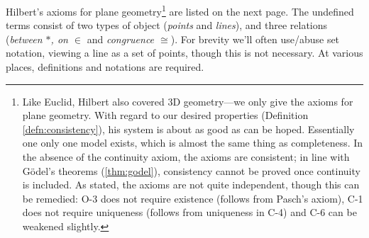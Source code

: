 Hilbert's axioms for plane geometry\footnote{Like Euclid, Hilbert also covered 3D geometry---we only give the axioms for plane geometry. With regard to our desired properties (Definition \ref{defn:consistency}), his system is about as good as can be hoped. Essentially one only one model exists, which is almost the same thing as completeness. In the absence of the continuity axiom, the axioms are consistent; in line with Gödel's theorems (\ref{thm:godel}), consistency cannot be proved once continuity is included. As stated, the axioms are not quite independent, though this can be remedied: O-3 does not require existence (follows from Pasch's axiom), C-1 does not require uniqueness (follows from uniqueness in C-4) and C-6 can be weakened slightly.} are listed on the next page. The undefined terms consist of two types of object (\emph{points} and \emph{lines}), and three relations (\emph{between $*$, on $\in$} and \emph{congruence $\cong$}). For brevity we'll often use/abuse set notation, viewing a line as a set of points, though this is not necessary. At various places, definitions and notations are required.

